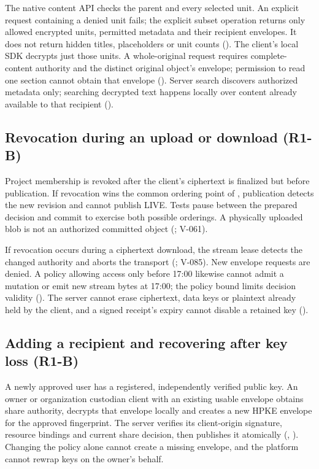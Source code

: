 The native content API checks the parent and every selected unit. An explicit request containing a denied unit fails; the explicit subset operation returns only allowed encrypted units, permitted metadata and their recipient envelopes. It does not return hidden titles, placeholders or unit counts (). The client's local SDK decrypts just those units. A whole-original request requires complete-content authority and the distinct original object's envelope; permission to read one section cannot obtain that envelope (). Server search discovers authorized metadata only; searching decrypted text happens locally over content already available to that recipient ().

\subsection{Revocation during an upload or download (R1-B)}
Project membership is revoked after the client's ciphertext is finalized but before publication. If revocation wins the common ordering point of , publication detects the new revision and cannot publish LIVE. Tests pause between the prepared decision and commit to exercise both possible orderings. A physically uploaded blob is not an authorized committed object (; V-061).

If revocation occurs during a ciphertext download, the stream lease detects the changed authority and aborts the transport (; V-085). New envelope requests are denied. A policy allowing access only before 17:00 likewise cannot admit a mutation or emit new stream bytes at 17:00; the policy bound limits decision validity (). The server cannot erase ciphertext, data keys or plaintext already held by the client, and a signed receipt's expiry cannot disable a retained key ().

\subsection{Adding a recipient and recovering after key loss (R1-B)}
A newly approved user has a registered, independently verified public key. An owner or organization custodian client with an existing usable envelope obtains share authority, decrypts that envelope locally and creates a new HPKE envelope for the approved fingerprint. The server verifies its client-origin signature, resource bindings and current share decision, then publishes it atomically (, ). Changing the policy alone cannot create a missing envelope, and the platform cannot rewrap keys on the owner's behalf.


